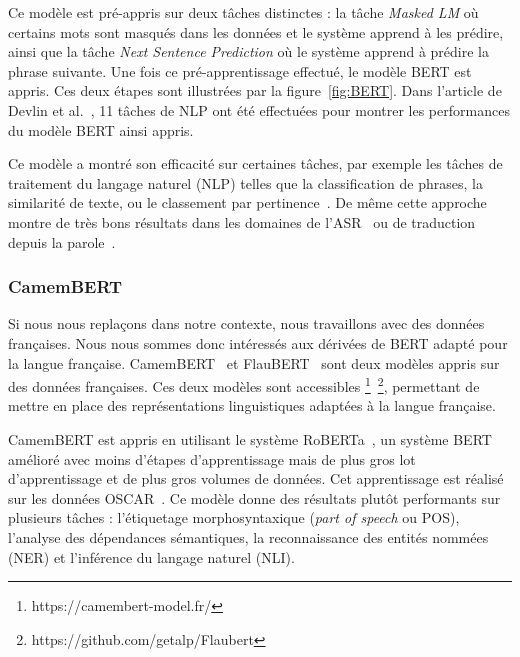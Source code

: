 Ce modèle est pré-appris sur deux tâches distinctes : la tâche \textit{Masked LM} où certains mots sont masqués dans les données et le système apprend à les prédire, ainsi que la tâche \textit{Next Sentence Prediction} où le système apprend à prédire la phrase suivante. Une fois ce pré-apprentissage effectué, le modèle BERT est appris. Ces deux étapes sont illustrées par la figure~\ref{fig:BERT}. Dans l'article de Devlin et al.~\cite{Devlin2019}, 11 tâches de NLP ont été effectuées pour montrer les performances du modèle BERT ainsi appris.   %



Ce modèle a montré son efficacité sur certaines tâches, par exemple %
les tâches de traitement du langage naturel (NLP) telles que la
classification de phrases, la similarité de texte, ou le classement par pertinence~\cite{Liu2019,Young2018,Yang2019}. De même cette approche montre de très bons résultats dans les domaines de l'ASR~\cite{Kahn2020,Liu2020} ou de traduction depuis la parole~\cite{Nguyen2020}.

\subsubsection{CamemBERT}
Si nous nous replaçons dans notre contexte, nous travaillons avec des données françaises. Nous nous sommes donc intéressés aux dérivées de BERT adapté pour la langue française. CamemBERT~\cite{Martin2020} et FlauBERT~\cite{Le2020} sont deux modèles appris sur des données françaises. Ces deux modèles sont accessibles \footnote{https://camembert-model.fr/}~\footnote{https://github.com/getalp/Flaubert}, permettant de mettre en place des représentations linguistiques adaptées à la langue française.

CamemBERT est appris en utilisant le système RoBERTa~\cite{Liu2019Roberta}, un système BERT amélioré avec moins d'étapes d'apprentissage mais de plus gros lot d'apprentissage et de plus gros volumes de données. Cet apprentissage est réalisé sur les données OSCAR~\cite{Ortizsuarez2019}. Ce modèle donne des résultats plutôt performants sur plusieurs tâches : l'étiquetage morphosyntaxique (\textit{part of speech} ou POS), l'analyse des dépendances sémantiques, la reconnaissance des entités nommées (NER) et l'inférence du langage naturel (NLI).

